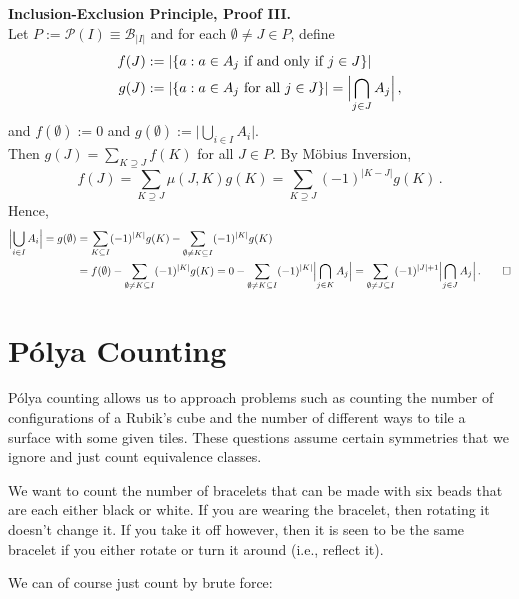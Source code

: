 \documentclass[a4paper]{article}
\newcommand{\example} {\bigskip\noindent{\bf Example.}\;\;}
\newcommand{\Bf}{\mathcal{B}}
\newcommand{\Pf}{\mathcal{P}}
\newcommand{\abs}[1]{\Bigl| #1 \Bigr|}
\newcommand{\ds}{\displaystyle}
\begin{document}
\medskip
\noindent
{\bfseries Inclusion-Exclusion Principle, Proof III.}\\
Let $P := \Pf(I) \equiv \Bf_{|I|}$ and for each $\emptyset\neq J \in P$, define
\begin{align*}
	f(J) & := |\{a : a \in A_j \text{ if and only if } j \in J\}|\\
	g(J) & := |\{a : a \in A_j \text{ for all } j \in J\}| = \abs{\bigcap_{j \in J}
A_j}\,,
\end{align*}
and $f(\emptyset) := 0$ and $g(\emptyset) := \bigl|\bigcup_{i \in I} A_i\bigr|$.\\
Then $\ds g(J) = \sum_{K\supseteq J} f(K)$ for all $J \in P$.
By M\"obius Inversion,
	\[ f(J) = \sum_{K \supseteq J} \mu(J,K) g(K) = \sum_{K \supseteq J} (-1)^{|K-J|}
g(K)\,.\]
Hence,
\begin{align*}
        \abs{\bigcup_{i \in I} A_i}
    = g(\emptyset)
 & = \sum_{K \subseteq I} (-1)^{|K|} g(K) - \sum_{\emptyset \neq K \subseteq I} (-1)^{|K|}
 g(K)\\
 & = f(\emptyset) - \sum_{\emptyset \neq K \subseteq I} (-1)^{|K|} g(K)
   = 0 - \sum_{\emptyset \neq K \subseteq I} (-1)^{|K|} \abs{\bigcap_{j \in K} A_j}
   = \sum_{\emptyset \neq J \subseteq I} (-1)^{|J|+1} \abs{\bigcap_{j \in J} A_j}\,.\qed
\end{align*}

\newpage
\section*{P\'olya Counting}


P\'olya counting allows us to approach problems such as
counting the number of configurations of a Rubik's cube and the number of different ways to tile a surface with some given tiles.
These questions assume certain symmetries that we ignore and just count equivalence classes.

\example
We want to count the number of bracelets that can be made with six beads
that are each either black or white.
If you are wearing the bracelet, then rotating it doesn't change it.
If you take it off however, then it is seen to be the same bracelet if you either rotate or turn it around (i.e., reflect it).

We can of course just count by brute force:
\end{document}
